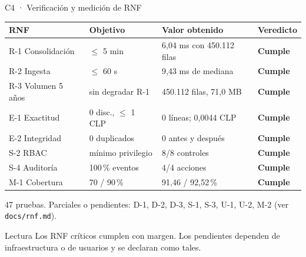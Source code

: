 \documentclass[aspectratio=169,10pt]{beamer}
\newcommand{\good}[1]{\textcolor{GoodGreen}{\textbf{#1}}}
\newcommand{\code}[1]{\texttt{\small #1}}
\begin{document}
\begin{frame}{C4 · Verificación y medición de RNF}
  \scriptsize
  \renewcommand{\arraystretch}{1.2}
  \begin{tabular}{@{}llll@{}}
    \toprule
    \textbf{RNF} & \textbf{Objetivo} & \textbf{Valor obtenido} & \textbf{Veredicto} \\
    \midrule
    R-1 Consolidación & $\leq$ 5 min & 6,04 ms con 450.112 filas & \good{Cumple} \\
    R-2 Ingesta & $\leq$ 60 s & 9,43 ms de mediana & \good{Cumple} \\
    R-3 Volumen 5 años & sin degradar R-1 & 450.112 filas, 71,0 MB & \good{Cumple} \\
    E-1 Exactitud & 0 disc., $\leq$ 1 CLP & 0 líneas; 0,0044 CLP & \good{Cumple} \\
    E-2 Integridad & 0 duplicados & 0 antes y después & \good{Cumple} \\
    S-2 RBAC & mínimo privilegio & 8/8 controles & \good{Cumple} \\
    S-4 Auditoría & 100\,\% eventos & 4/4 acciones & \good{Cumple} \\
    M-1 Cobertura & 70 / 90\,\% & 91,46 / 92,52\,\% & \good{Cumple} \\
    \bottomrule
  \end{tabular}
  \vspace{1.5mm}

  {\tiny 47 pruebas. Parciales o pendientes: D-1, D-2, D-3, S-1, S-3, U-1, U-2, M-2 (ver \code{docs/rnf.md}).}
  \vspace{1mm}

  \begin{block}{Lectura}
    Los RNF críticos cumplen con margen. Los pendientes dependen de infraestructura o de usuarios y se declaran como tales.
  \end{block}
\end{frame}
\end{document}
